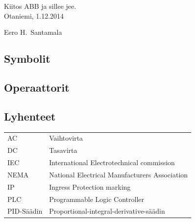 \documentclass[finnish,12pt,a4paper,pdftex,elec,utf8]{aaltothesis}
\begin{document}

Kiitos ABB ja sillee jee.\\

\vspace{5cm}
Otaniemi, 1.12.2014

\vspace{5mm}
{\hfill Eero H.\ Santamala \hspace{1cm}}

\newpage


\thesistableofcontents



\subsection*{Symbolit}


\subsection*{Operaattorit}



\subsection*{Lyhenteet}

\begin{tabular}{ll}
AC         & Vaihtovirta \\
DC         & Tasavirta \\
IEC	       & International Electrotechnical commission \\
NEMA       & National Electrical Manufacturers Association \\
IP		   & Ingress Protection marking \\
PLC		   & Programmable Logic Controller \\
PID-Säädin & Proportional-integral-derivative-säädin
\end{tabular}


\cleardoublepage
\storeinipagenumber
{}
\setcounter{page}{1}
\end{document}
